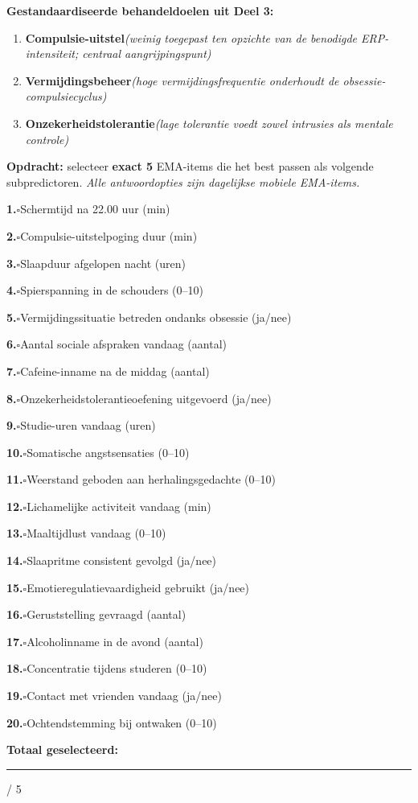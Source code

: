 \documentclass[11pt,a4paper]{article}
\newcommand{\checkitemBFS}[2]{%
\noindent\small\textbf{#1.}\hspace{0.45em}$\square$\hspace{0.4em}#2\par\vspace{0.20em}}
\begin{document}
\begin{contextbox}
\small\textbf{Gestandaardiseerde behandeldoelen uit Deel 3:}
\begin{enumerate}[topsep=2pt,itemsep=1pt,label=\arabic*.]
\item \textbf{Compulsie-uitstel}\quad\textit{\small (weinig toegepast ten opzichte van de benodigde ERP-intensiteit; centraal aangrijpingspunt)}
\item \textbf{Vermijdingsbeheer}\quad\textit{\small (hoge vermijdingsfrequentie onderhoudt de obsessie-compulsiecyclus)}
\item \textbf{Onzekerheidstolerantie}\quad\textit{\small (lage tolerantie voedt zowel intrusies als mentale controle)}
\end{enumerate}
\end{contextbox}

\begin{responsebox}
\small\textbf{Opdracht:} selecteer \textbf{exact 5} EMA-items die het best passen als volgende subpredictoren.
\textit{Alle antwoordopties zijn dagelijkse mobiele EMA-items.}

\checkitemBFS{1}{Schermtijd na 22.00 uur (min)}
\checkitemBFS{2}{Compulsie-uitstelpoging duur (min)}
\checkitemBFS{3}{Slaapduur afgelopen nacht (uren)}
\checkitemBFS{4}{Spierspanning in de schouders (0--10)}
\checkitemBFS{5}{Vermijdingssituatie betreden ondanks obsessie (ja/nee)}
\checkitemBFS{6}{Aantal sociale afspraken vandaag (aantal)}
\checkitemBFS{7}{Cafeine-inname na de middag (aantal)}
\checkitemBFS{8}{Onzekerheidstolerantieoefening uitgevoerd (ja/nee)}
\checkitemBFS{9}{Studie-uren vandaag (uren)}
\checkitemBFS{10}{Somatische angstsensaties (0--10)}
\checkitemBFS{11}{Weerstand geboden aan herhalingsgedachte (0--10)}
\checkitemBFS{12}{Lichamelijke activiteit vandaag (min)}
\checkitemBFS{13}{Maaltijdlust vandaag (0--10)}
\checkitemBFS{14}{Slaapritme consistent gevolgd (ja/nee)}
\checkitemBFS{15}{Emotieregulatievaardigheid gebruikt (ja/nee)}
\checkitemBFS{16}{Geruststelling gevraagd (aantal)}
\checkitemBFS{17}{Alcoholinname in de avond (aantal)}
\checkitemBFS{18}{Concentratie tijdens studeren (0--10)}
\checkitemBFS{19}{Contact met vrienden vandaag (ja/nee)}
\checkitemBFS{20}{Ochtendstemming bij ontwaken (0--10)}
\vspace{0.4em}
\noindent\textbf{Totaal geselecteerd:}\hspace{0.5em}\rule{1.2cm}{0.25pt}\hspace{0.2em}/ 5
\end{responsebox}
\end{document}
